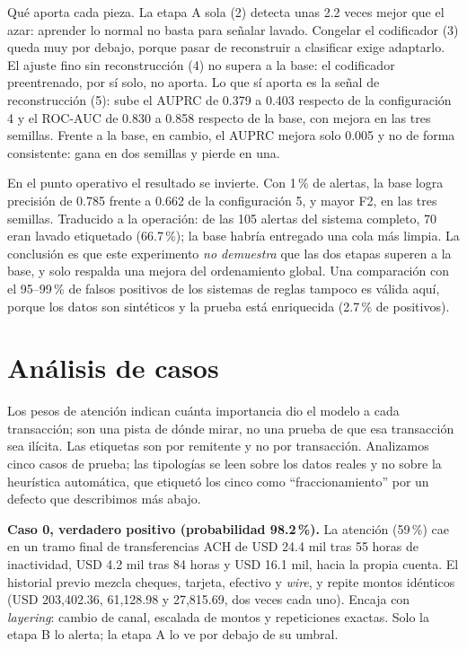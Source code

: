 \documentclass[11pt,a4paper]{article}
\begin{document}
Qué aporta cada pieza. La etapa A sola (2) detecta unas 2.2 veces mejor que el azar: aprender lo normal no basta para señalar lavado. Congelar el codificador (3) queda muy por debajo, porque pasar de reconstruir a clasificar exige adaptarlo. El ajuste fino sin reconstrucción (4) no supera a la base: el codificador preentrenado, por sí solo, no aporta. Lo que sí aporta es la señal de reconstrucción (5): sube el AUPRC de 0.379 a 0.403 respecto de la configuración 4 y el ROC-AUC de 0.830 a 0.858 respecto de la base, con mejora en las tres semillas. Frente a la base, en cambio, el AUPRC mejora solo 0.005 y no de forma consistente: gana en dos semillas y pierde en una.

En el punto operativo el resultado se invierte. Con 1\,\% de alertas, la base logra precisión de 0.785 frente a 0.662 de la configuración 5, y mayor F2, en las tres semillas. Traducido a la operación: de las 105 alertas del sistema completo, 70 eran lavado etiquetado (66.7\,\%); la base habría entregado una cola más limpia. La conclusión es que este experimento \emph{no demuestra} que las dos etapas superen a la base, y solo respalda una mejora del ordenamiento global. Una comparación con el 95--99\,\% de falsos positivos de los sistemas de reglas tampoco es válida aquí, porque los datos son sintéticos y la prueba está enriquecida (2.7\,\% de positivos).

\section{Análisis de casos}
Los pesos de atención indican cuánta importancia dio el modelo a cada transacción; son una pista de dónde mirar, no una prueba de que esa transacción sea ilícita. Las etiquetas son por remitente y no por transacción. Analizamos cinco casos de prueba; las tipologías se leen sobre los datos reales y no sobre la heurística automática, que etiquetó los cinco como ``fraccionamiento'' por un defecto que describimos más abajo.

\textbf{Caso 0, verdadero positivo (probabilidad 98.2\,\%).} La atención (59\,\%) cae en un tramo final de transferencias ACH de USD 24.4 mil tras 55 horas de inactividad, USD 4.2 mil tras 84 horas y USD 16.1 mil, hacia la propia cuenta. El historial previo mezcla cheques, tarjeta, efectivo y \emph{wire}, y repite montos idénticos (USD 203,402.36, 61,128.98 y 27,815.69, dos veces cada uno). Encaja con \emph{layering}: cambio de canal, escalada de montos y repeticiones exactas. Solo la etapa B lo alerta; la etapa A lo ve por debajo de su umbral.
\end{document}
